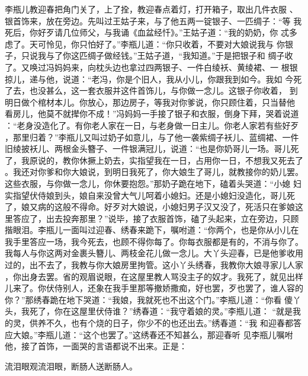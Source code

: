 李瓶儿教迎春把角门关了，上了拴，教迎春点着灯，打开箱子，取出几件衣服
、银首饰来，放在旁边。先叫过王姑子来，与了他五两一锭银子、一匹绸子：“等
我死后，你好歹请几位师父，与我诵《血盆经忏》。”王姑子道：“我的奶奶，你
忒多虑了。天可怜见，你只怕好了。”李瓶儿道：“你只收着，不要对大娘说我与
你银子，只说我与了你这匹绸子做经钱。”王姑子道，“我知道。”于是把银子和
绸子收了。又唤过冯妈妈来，向枕头边也拿过四两银子、一件白绫袄、黄绫裙、一
根银掠儿，递与他，说道：“老冯，你是个旧人，我从小儿，你跟我到如今。我如
今死了去，也没甚么，这一套衣服并这件首饰儿，与你做一念儿。这银子你收着，
到明日做个棺材本儿。你放心，那边房子，等我对你爹说，你只顾住着，只当替他
看房儿，他莫不就撵你不成！”冯妈妈一手接了银子和衣服，倒身下拜，哭着说道
：“老身没造化了。有你老人家在一日，与老身做一日主儿。你老人家若有些好歹
，那里归着？”李瓶儿又叫过奶子如意儿，与了他一袭紫绸子袄儿、蓝绸裙、一件
旧绫披袄儿、两根金头簪子、一件银满冠儿，说道：“也是你奶哥儿一场。哥儿死
了，我原说的，教你休撅上奶去，实指望我在一日，占用你一日，不想我又死去了
。我还对你爹和你大娘说，到明日我死了，你大娘生了哥儿，就教接你的奶儿罢。
这些衣服，与你做一念儿，你休要抱怨。”那奶子跪在地下，磕着头哭道：“小媳
妇实指望伏侍娘到头，娘自来没曾大气儿呵着小媳妇。还是小媳妇没造化，哥儿死
了，娘又病的这般不得命。好歹对大娘说，小媳妇男子汉又没了，死活只在爹娘这
里答应了，出去投奔那里？”说毕，接了衣服首饰，磕了头起来，立在旁边，只顾
揩眼泪。李瓶儿一面叫过迎春、绣春来跪下，嘱咐道：“你两个，也是你从小儿在
我手里答应一场，我今死去，也顾不得你每了。你每衣服都是有的，不消与你了。
我每人与你这两对金裹头簪儿、两枝金花儿做一念儿。大丫头迎春，已是他爹收用
过的，出不去了，我教与你大娘房里拘管。这小丫头绣春，我教你大娘寻家儿人家
，你出身去罢。省的观眉说眼，在这屋里教人骂没主子的奴才。我死了，就见出样
儿来了。你伏侍别人，还象在我手里那等撤娇撒痴，好也罢，歹也罢了，谁人容的
你？”那绣春跪在地下哭道：“我娘，我就死也不出这个门。”李瓶儿道：“你看
傻丫头，我死了，你在这屋里伏侍谁？”绣春道：“我守着娘的灵。”李瓶儿道：
“就是我的灵，供养不久，也有个烧的日子，你少不的也还出去。”绣春道：“我
和迎春都答应大娘。”李瓶儿道：“这个也罢了。”这绣春还不知甚么，那迎春听
见李瓶儿嘱咐他，接了首饰，一面哭的言语都说不出来。正是：

流泪眼观流泪眼，断肠人送断肠人。


